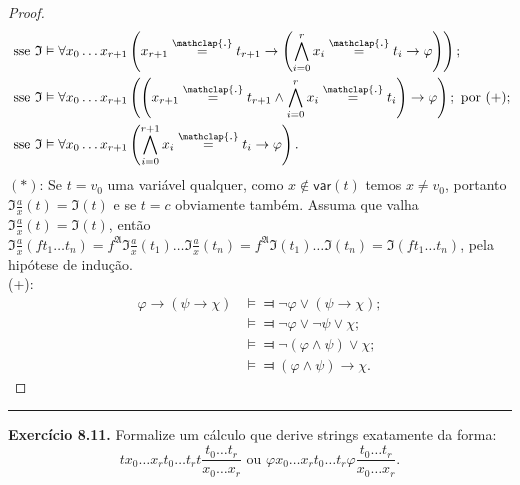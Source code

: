 \documentclass[11pt]{article}
\theoremstyle{definition}
\newcommand{\mf}[1]{\mathfrak{#1}}
\newcommand{\msf}[1]{\mathsf{#1}}
\newcommand\overtext[2]{\stackrel{\mathclap{\normalfont\mbox{#1}}}{#2}}
\begin{document}
\begin{proof}
\begin{align*}
        & \text{ sse }\mf{I}\vDash\forall x_0\dots x_{r+1}\left(x_{r+1}\overtext{.}{=}t_{r+1}\rightarrow\left(\bigwedge_{i=0}^rx_i\overtext{.}{=}t_i\rightarrow\varphi\right)\right);\\
        & \text{ sse }\mf{I}\vDash\forall x_0\dots x_{r+1}\left(\left(x_{r+1}\overtext{.}{=}t_{r+1}\wedge\bigwedge_{i=0}^rx_i\overtext{.}{=}t_i\right)\rightarrow\varphi\right);\text{ por (+)};\\
        & \text{ sse }\mf{I}\vDash\forall x_0\dots x_{r+1}\left(\bigwedge_{i=0}^{r+1}x_i\overtext{.}{=}t_i\rightarrow\varphi\right).
    \end{align*}
    $(*)$: Se $t=v_0$ uma variável qualquer, como $x\notin\msf{var}(t)$ temos $x\ne v_0$, portanto $\mf{I}\frac{a}{x}(t)=\mf{I}(t)$ e se $t=c$ obviamente também. Assuma que valha $\mf{I}\frac{a}{x}(t)=\mf{I}(t)$, então $\mf{I}\frac{a}{x}(ft_1\dots t_n)=f^\mf{A}\mf{I}\frac{a}{x}(t_1)\dots\mf{I}\frac{a}{x}(t_n)=f^\mf{A}\mf{I}(t_1)\dots\mf{I}(t_n)=\mf{I}(ft_1\dots t_n)$, pela hipótese de indução.\\
    (+):
    \begin{align*}
        \varphi\rightarrow(\psi\rightarrow\chi) & \vDash\Dashv \neg\varphi\vee(\psi\rightarrow\chi);\\
        & \vDash\Dashv \neg\varphi\vee\neg\psi\vee\chi;\\
        & \vDash\Dashv \neg(\varphi\wedge\psi)\vee\chi;\\
        & \vDash\Dashv (\varphi\wedge\psi)\rightarrow\chi.
    \end{align*}
\end{proof}

\hrule

\textbf{Exercício 8.11.} Formalize um cálculo que derive strings exatamente da forma: $$tx_0\dots x_rt_0\dots t_rt\frac{t_0\dots t_r}{x_0\dots x_r}\text{ ou }\varphi x_0\dots x_rt_0\dots t_r\varphi\frac{t_0\dots t_r}{x_0\dots x_r}.$$
\end{document}

